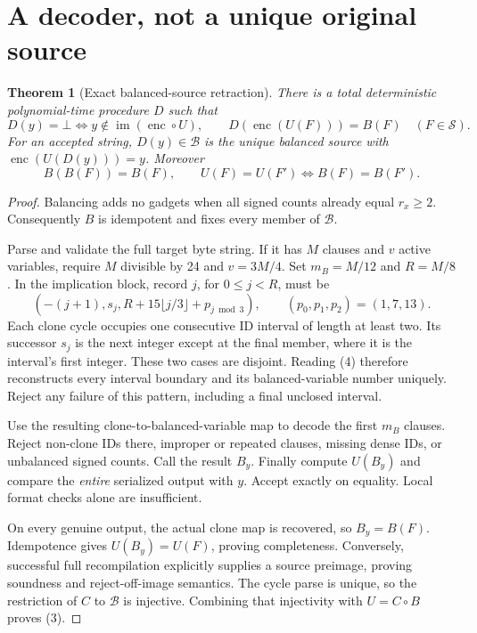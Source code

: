 \documentclass[11pt]{article}
\newtheorem{theorem}{Theorem}
\newcommand{\Img}{\operatorname{im}}
\newcommand{\enc}{\operatorname{enc}}
\begin{document}
\section{A decoder, not a unique original source}
\begin{theorem}[Exact balanced-source retraction]\label{thm:decode}
There is a total deterministic polynomial-time procedure $D$ such that
\[
 D(y)=\bot\iff y\notin\Img(\enc\circ U),\qquad
 D(\enc(U(F)))=B(F)\quad(F\in\mathcal S).                  \tag{2}
\]
For an accepted string, $D(y)\in\mathcal B$ is the unique balanced source with
$\enc(U(D(y)))=y$. Moreover
\[
 B(B(F))=B(F),\qquad
 U(F)=U(F')\iff B(F)=B(F').                                \tag{3}
\]
\end{theorem}
\begin{proof}
Balancing adds no gadgets when all signed counts already equal $r_x\ge2$.
Consequently $B$ is idempotent and fixes every member of $\mathcal B$.

Parse and validate the full target byte string. If it has $M$ clauses and $v$
active variables, require $M$ divisible by 24 and $v=3M/4$. Set $m_B=M/12$
and $R=M/8$. In the implication block, record $j$, for $0\le j<R$, must be
\[
 (-(j+1),s_j,R+15\lfloor j/3\rfloor+p_{j\bmod3}),
 \qquad(p_0,p_1,p_2)=(1,7,13).                             \tag{4}
\]
Each clone cycle occupies one consecutive ID interval of length at least two.
Its successor $s_j$ is the next integer except at the final member, where it
is the interval's first integer. These two cases are disjoint. Reading (4)
therefore reconstructs every interval boundary and its balanced-variable
number uniquely. Reject any failure of this pattern, including a final
unclosed interval.

Use the resulting clone-to-balanced-variable map to decode the first $m_B$
clauses. Reject non-clone IDs there, improper or repeated clauses, missing
dense IDs, or unbalanced signed counts. Call the result $B_y$.
Finally compute $U(B_y)$ and compare the \emph{entire} serialized output with
$y$. Accept exactly on equality. Local format checks alone are insufficient.

On every genuine output, the actual clone map is recovered, so $B_y=B(F)$.
Idempotence gives $U(B_y)=U(F)$, proving completeness. Conversely, successful
full recompilation explicitly supplies a source preimage, proving soundness
and reject-off-image semantics. The cycle parse is unique, so the restriction
of $C$ to $\mathcal B$ is injective. Combining that injectivity with
$U=C\circ B$ proves (3).
\end{proof}
\end{document}
